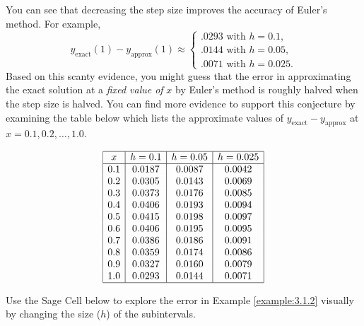 \documentclass{ximera}
\begin{document}
\begin{example}
\begin{explanation}
You can see that decreasing the step size
improves the accuracy of Euler's method. For example,
$$
y_{\text{exact}}(1)-y_{\text{approx}}(1)\approx
\left\{\begin{array}{l}
.0293\text{ with }h=0.1,\\
.0144\text{ with }h=0.05,\\
.0071\text{ with }h=0.025.
\end{array}\right.
$$
Based on this scanty evidence, you might guess that the error in
approximating the exact solution at a \textit{fixed value of} $x$ by
Euler's method is roughly halved when the step size is halved. You can
find more evidence to support this conjecture by examining
the table below which lists the approximate values of
$y_{\text{exact}}-y_{\text{approx}}$ at
$x=0.1, 0.2, \dots, 1.0$.
 
$$
\begin{array}{|c|c|c|c|}
\hline
x & h=0.1 & h=0.05 & h=0.025\\ \hline
0.1 & 0.0187 & 0.0087 & 0.0042\\
0.2 & 0.0305 & 0.0143 & 0.0069\\
0.3 & 0.0373 & 0.0176 & 0.0085\\
0.4 & 0.0406 & 0.0193 & 0.0094\\
0.5 & 0.0415 & 0.0198 & 0.0097\\
0.6 & 0.0406 & 0.0195 & 0.0095\\
0.7 & 0.0386 & 0.0186 & 0.0091\\
0.8 & 0.0359 & 0.0174 & 0.0086\\
0.9 & 0.0327 & 0.0160 & 0.0079\\
1.0 & 0.0293 & 0.0144 & 0.0071\\
\hline
\end{array}
$$

\end{explanation}
\end{example}
 
Use the Sage Cell below to explore the error in Example \ref{example:3.1.2} visually by changing the size ($h$) of the subintervals.
 
%
%
%
 
\end{document}
